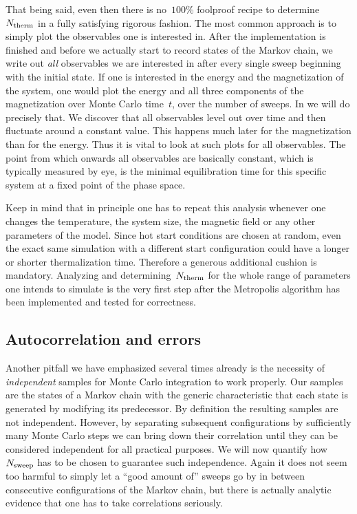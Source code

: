 That being said, even then there is no~$100$\% foolproof recipe to
determine~$N_{\mathrm{therm}}$ in a fully satisfying rigorous fashion. The most common
approach is to simply plot the observables one is interested in. After the
implementation is finished and before we actually start to record states of the
Markov chain, we write out \emph{all} observables we are interested in after
every single sweep beginning with the initial state. If one is interested in the
energy and the magnetization of the system, one would plot the energy and all
three components of the magnetization over Monte Carlo time~$t$, \ie{} over the
number of sweeps. In  we will do precisely that. We discover
that all observables level out over time and then fluctuate around a constant
value. This happens much later for the magnetization than for the energy. Thus
it is vital to look at such plots for all observables. The point from which
onwards all observables are basically constant, which is typically measured by
eye, is the minimal equilibration time for this specific system at a fixed point
of the phase space.

Keep in mind that in principle one has to repeat this analysis whenever one
changes the temperature, the system size, the magnetic field or any other
parameters of the model. Since hot start conditions are chosen at random, even
the exact same simulation with a different start configuration could have a
longer or shorter thermalization time. Therefore a generous additional cushion
is mandatory. Analyzing and determining~$N_{\mathrm{therm}}$ for the whole range of
parameters one intends to simulate is the very first step after the Metropolis
algorithm has been implemented and tested for correctness.

\subsection{Autocorrelation and errors}

Another pitfall we have emphasized several times already is the necessity of
\emph{independent} samples for Monte Carlo integration to work properly. Our
samples are the states of a Markov chain with the generic characteristic that
each state is generated by modifying its predecessor. By definition the
resulting samples are not independent. However, by separating subsequent
configurations by sufficiently many Monte Carlo steps we can bring down their
correlation until they can be considered independent for all practical purposes.
We will now quantify how~$N_{\mathrm{sweep}}$ has to be chosen to guarantee such
independence. Again it does not seem too harmful to simply let a ``good amount
of'' sweeps go by in between consecutive configurations of the Markov chain, but
there is actually analytic evidence that one has to take correlations seriously.

